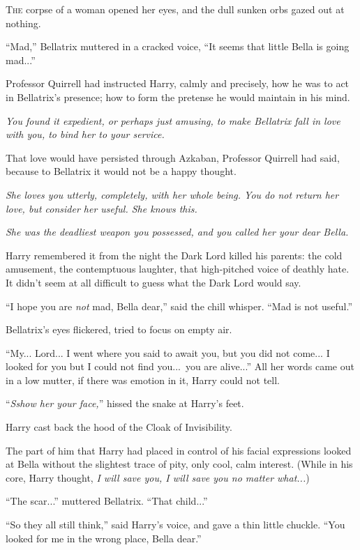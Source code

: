 \lettrine{T}{he} corpse of a woman opened her eyes, and the dull sunken orbs gazed out at nothing.

“Mad,” Bellatrix muttered in a cracked voice, “It seems that little Bella is going mad...”

Professor Quirrell had instructed Harry, calmly and precisely, how he was to act in Bellatrix’s presence; how to form the pretense he would maintain in his mind.

\emph{You found it expedient, or perhaps just amusing, to make Bellatrix fall in love with you, to bind her to your service.}

That love would have persisted through Azkaban, Professor Quirrell had said, because to Bellatrix it would not be a happy thought.

\emph{She loves you utterly, completely, with her whole being. You do not return her love, but consider her useful. She knows this.}

\emph{She was the deadliest weapon you possessed, and you called her your dear Bella.}

Harry remembered it from the night the Dark Lord killed his parents: the cold amusement, the contemptuous laughter, that high-pitched voice of deathly hate. It didn’t seem at all difficult to guess what the Dark Lord would say.

“I hope you are \emph{not} mad, Bella dear,” said the chill whisper. “Mad is not useful.”

Bellatrix’s eyes flickered, tried to focus on empty air.

“My... Lord... I went where you said to await you, but you did not come... I looked for you but I could not find you...\ you are alive...” All her words came out in a low mutter, if there was emotion in it, Harry could not tell.

“\emph{Sshow her your face,}” hissed the snake at Harry’s feet.

Harry cast back the hood of the Cloak of Invisibility.

The part of him that Harry had placed in control of his facial expressions looked at Bella without the slightest trace of pity, only cool, calm interest. (While in his core, Harry thought, \emph{I will save you, I will save you no matter what...})

“The scar...” muttered Bellatrix. “That child...”

“So they all still think,” said Harry’s voice, and gave a thin little chuckle. “You looked for me in the wrong place, Bella dear.”

